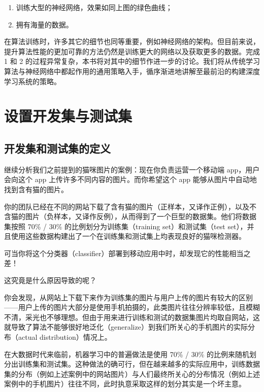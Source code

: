 \begin{enumerate}
\def\labelenumi{\arabic{enumi}.}
\item
  训练大型的神经网络，效果如同上图的绿色曲线；
\item
  拥有海量的数据。
\end{enumerate}

在算法训练时，许多其它的细节也同等重要，例如神经网络的架构。但目前来说，提升算法性能的更加可靠的方法仍然是训练更大的网络以及获取更多的数据。完成
1 和 2
的过程异常复杂，本书将对其中的细节作进一步的讨论。我们将从传统学习算法与神经网络中都起作用的通用策略入手，循序渐进地讲解至最前沿的构建深度学习系统的策略。

\hypertarget{ux8bbeux7f6eux5f00ux53d1ux96c6ux4e0eux6d4bux8bd5ux96c6}{%
\part{设置开发集与测试集}\label{ux8bbeux7f6eux5f00ux53d1ux96c6ux4e0eux6d4bux8bd5ux96c6}}

\hypertarget{ux5f00ux53d1ux96c6ux548cux6d4bux8bd5ux96c6ux7684ux5b9aux4e49}{%
\chapter{开发集和测试集的定义}\label{ux5f00ux53d1ux96c6ux548cux6d4bux8bd5ux96c6ux7684ux5b9aux4e49}}

继续分析我们之前提到的猫咪图片的案例：现在你负责运营一个移动端
app，用户会向这个 app 上传许多不同内容的图片。而你希望这个 app
能够从图片中自动地找到含有猫的图片。

你的团队已经在不同的网站下载了含有猫的图片（正样本，又译作正例），以及不含猫的图片（负样本，又译作反例），从而得到了一个巨型的数据集。他们将数据集按照
70\% / 30\% 的比例划分为训练集（training set）和测试集（test
set），并且使用这些数据构建出了一个在训练集和测试集上均表现良好的猫咪检测器。

可当你将这个分类器（classifier）部署到移动应用中时，却发现它的性能相当之差！

这究竟是什么原因导致的呢？

你会发现，从网站上下载下来作为训练集的图片与用户上传的图片有较大的区别------用户上传的图片大部分是使用手机拍摄的，此类图片往往分辨率较低，且模糊不清，采光也不够理想。但由于用来进行训练和测试的数据集图片均取自网站，这就导致了算法不能够很好地泛化（generalize）到我们所关心的手机图片的实际分布（actual
distribution）情况上。

在大数据时代来临前，机器学习中的普遍做法是使用 70\% / 30\%
的比例来随机划分出训练集和测试集。这种做法的确可行，但在越来越多的实际应用中，训练数据集的分布（例如上述案例中的网站图片）与人们最终所关心的分布情况（例如上述案例中的手机图片）往往不同，此时执意采取这样的划分其实是一个坏主意。

